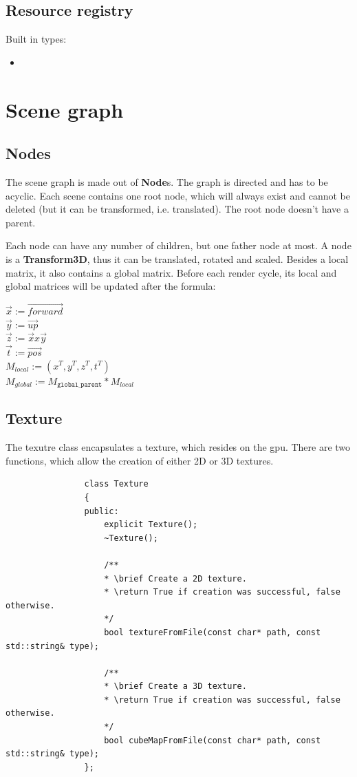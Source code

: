\documentclass[12p, paper=a4, leqno, colorinlistoftodos]{article}
\begin{document}
		\subsection{Resource registry}
		Built in types:
		\begin{itemize}
			\item 
		\end{itemize}
		
	\pagebreak
	\section{Scene graph}
		\subsection{Nodes}
			The scene graph is made out of \textbf{Node}s. The graph is directed and has to be acyclic. Each scene contains one root node, which will always exist and cannot be deleted (but it can be transformed, i.e. translated). The root node doesn't have a parent.
			
			Each node can have any number of children, but one father node at most. A node is a \textbf{Transform3D}, thus it can be translated, rotated and scaled. Besides a local matrix, it also contains a global matrix. Before each render cycle, its local and global matrices will be updated after the formula:
			\begin{algorithm}
				$\vec{x} := \vec{forward}$\\
				$\vec{y} := \vec{up}$\\
				$\vec{z} := \vec{x} x \vec{y}$\\
				$\vec{t} := \vec{pos}$\\
				$M_{local} := (x^T, y^T, z^T, t^T)$\\
				$M_{global} := M_{\texttt{global\_parent}} * M_{local}$\\
			\end{algorithm}
				
		\subsection{Texture}
			The texutre class encapsulates a texture, which resides on the gpu. There are two functions, which allow the creation of either 2D or 3D textures.			
			\begin{lstlisting}
				class Texture
				{
				public:
					explicit Texture();
					~Texture();
					
					/**
					* \brief Create a 2D texture.
					* \return True if creation was successful, false otherwise.
					*/
					bool textureFromFile(const char* path, const std::string& type);
					
					/** 
					* \brief Create a 3D texture.
					* \return True if creation was successful, false otherwise.
					*/
					bool cubeMapFromFile(const char* path, const std::string& type);
				};	
			\end{lstlisting}
		
\end{document}
